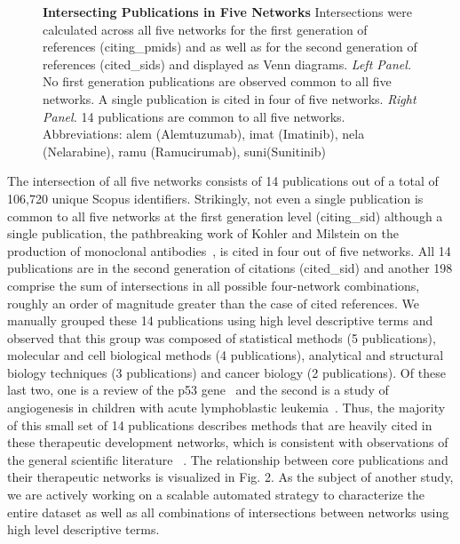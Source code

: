 \documentclass[10pt,letterpaper]{article}
\begin{document}
\begin{figure}[!h]
\begin{adjustwidth}{-0.5in}{0in} %
\centering
\scalebox{0.99}
{
\begin{subfigure}{.5\textwidth}
  \centering
  \label{fig:sub1}
\end{subfigure}
\begin{subfigure}{.5\textwidth}
  \centering
  \label{fig:sub2}
\end{subfigure}
}
\caption{{\bf Intersecting Publications in Five Networks} Intersections were calculated across all five networks for the first generation of references (citing\_pmids) and 
as well as for the second generation of references (cited\_sids) and displayed as Venn diagrams.  \emph{Left Panel.} No first generation publications are observed common to all five networks. A single publication is cited in four of five networks. \emph{Right Panel.} 14  publications are common to all five networks. Abbreviations: alem (Alemtuzumab), imat (Imatinib), nela (Nelarabine), ramu (Ramucirumab), suni(Sunitinib)}
\label{fig: test}
\end{adjustwidth}
\end{figure}


The intersection of all five networks consists of 14 publications out of a total of 106,720 unique Scopus identifiers. Strikingly, not even a single publication is common to all five networks at the first generation level (citing\_sid) although a single publication, the pathbreaking work of Kohler and Milstein on the production of monoclonal antibodies~\cite{bibKohler}, is cited in four out of five networks. All 14 publications are in the second generation of citations (cited\_sid) and another 198 comprise the sum of intersections in all possible four-network combinations, roughly an order of magnitude greater than the case of cited references. We manually grouped these 14 publications using high level descriptive terms and observed that this group was composed of  statistical methods (5 publications), molecular and cell biological methods (4 publications), analytical and structural biology techniques (3 publications) and cancer biology (2 publications). Of these last two, one is a review of the p53 gene~\cite{bibLevine} and the second is a study of angiogenesis in children with acute lymphoblastic leukemia~\cite{bibFolkman}. Thus, the majority of this small set of 14 publications describes methods that are heavily cited in these therapeutic development networks, which is consistent with observations of the general scientific literature ~\cite{bibVanNoorden}. The relationship between core publications and their therapeutic networks is visualized in Fig. 2. As the subject of another study, we are actively working on a scalable automated strategy to characterize the entire dataset as well as all combinations of intersections between networks using high level descriptive terms.
\end{document}
